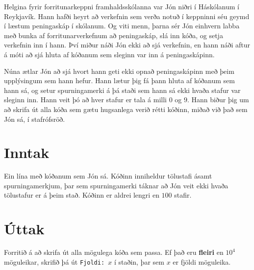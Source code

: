 

Helgina fyrir forritunarkeppni framhaldsskólanna var Jón niðri í Háskólanum í
Reykjavík. Hann hafði heyrt að verkefnin sem verða notuð í keppninni séu geymd
í læstum peningaskáp í skólanum. Og viti menn, þarna sér Jón einhvern labba með
bunka af forritunarverkefnum að peningaskáp, slá inn kóða, og setja verkefnin
inn í hann. Því miður náði Jón ekki að sjá verkefnin, en hann náði aftur á móti
að sjá hluta af kóðanum sem sleginn var inn á peningaskápinn.

Núna ætlar Jón að sjá hvort hann geti ekki opnað peningaskápinn með þeim
upplýsingum sem hann hefur. Hann lætur þig fá þann hluta af kóðanum sem hann
sá, og setur spurningamerki á þá staði sem hann sá ekki hvaða stafur var
sleginn inn. Hann veit þó að hver stafur er tala á milli $0$ og $9$. Hann biður
þig um að skrifa út alla kóða sem gætu hugsanlega verið rétti kóðinn, miðað við
það sem Jón sá, í stafrófsröð.

\section*{Inntak}
Ein lína með kóðanum sem Jón sá. Kóðinn inniheldur tölustafi ásamt
spurningamerkjum, þar sem spurningamerki táknar að Jón veit ekki hvaða
tölustafur er á þeim stað. Kóðinn er aldrei lengri en $100$ stafir.

\section*{Úttak}
Forritið á að skrifa út alla mögulega kóða sem passa. Ef það eru
\textbf{fleiri} en $10^4$ möguleikar, skrifið þá út \texttt{Fjoldi: $x$} í
staðin, þar sem $x$ er fjöldi möguleika.

